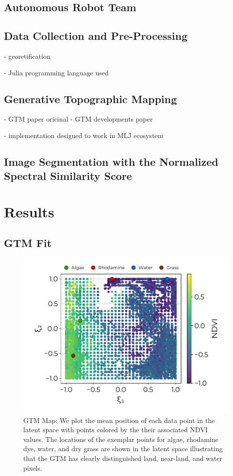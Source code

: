 \documentclass[remotesensing,article,submit,pdftex,moreauthors]{Definitions/mdpi}
\begin{document}
\subsection{Autonomous Robot Team}
\subsection{Data Collection and Pre-Processing}

- georetification \cite{muller2002program, baumker2001new, mostafa2000multi}

- Julia programming language used \cite{bezanson2012julia}

\subsection{Generative Topographic Mapping}

- GTM paper oricinal \cite{gtm-bishop-1}
- GTM developments paper \cite{gtm-biship-2}

- implementation designed to work in MLJ ecosystem \cite{blaom2020mlj}


\subsection{Image Segmentation with the Normalized Spectral Similarity Score}

\section{Results}

\subsection{GTM Fit}

\begin{figure}[t]
\centering
\includegraphics[width=0.8\columnwidth]{paper/figures/results/square-ndvi.pdf}
\caption{GTM Map: We plot the mean position of each data point in the latent space with points colored by the their associated NDVI values. The locations of the exemplar points for algae, rhodamine dye, water, and dry grass are shown in the latent space illustrating that the GTM has clearly distinguished land, near-land, and water pixels.\label{fig:}}
\end{figure}  
\end{document}

